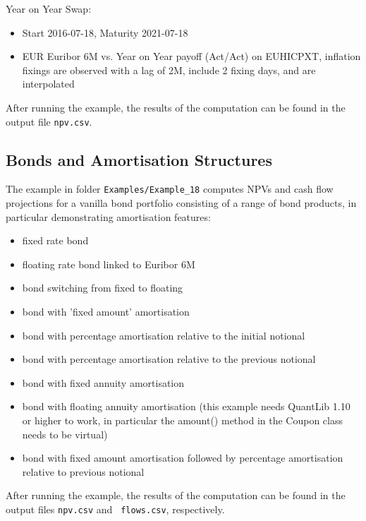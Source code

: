 \documentclass[12pt, a4paper]{article}
\begin{document}
Year on Year Swap:

\begin{itemize}
\item Start 2016-07-18, Maturity 2021-07-18
\item EUR Euribor 6M vs. Year on Year payoff (Act/Act) on EUHICPXT, inflation fixings are observed with a lag of 2M,
  include 2 fixing days, and are interpolated
\end{itemize}

After running the example, the results of the computation can be found in the output file {\tt npv.csv}.


\subsection{Bonds and Amortisation Structures}

The example in folder {\tt Examples/Example\_18} computes NPVs and cash flow projections for a vanilla bond portfolio
consisting of a range of bond products, in particular demonstrating amortisation features:
\begin{itemize}
\item fixed rate bond
\item floating rate bond linked to Euribor 6M
\item bond switching from fixed to floating
\item bond with 'fixed amount' amortisation
\item bond with percentage amortisation relative to the initial notional
\item bond with percentage amortisation relative to the previous notional
\item bond with fixed annuity amortisation
\item bond with floating annuity amortisation (this example needs QuantLib 1.10 or higher to work, in particular the amount() method in the Coupon class needs to be virtual)
\item bond with fixed amount amortisation followed by percentage amortisation relative to previous notional
\end{itemize}

After running the example, the results of the computation can be found in the output files {\tt npv.csv} and {\tt
  flows.csv}, respectively.
\end{document}

